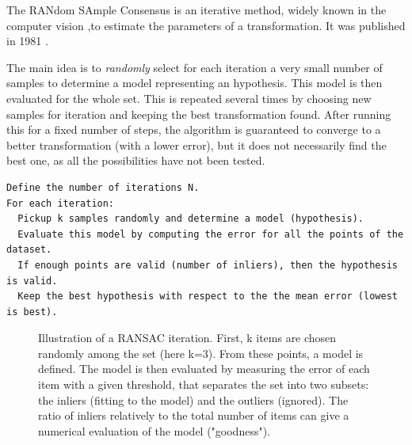 The RANdom SAmple Consensus is an iterative method, widely known in the computer vision ,to estimate the parameters of a transformation. It was published in 1981 \cite{FischlerB81}.

The main idea is to \emph{randomly} select for each iteration a very small number of samples to determine a model representing an hypothesis. This model is then evaluated for the whole set. This is repeated several times by choosing new samples for iteration and keeping the best transformation found. After running this for a fixed number of steps, the algorithm is guaranteed to converge to a better transformation (with a lower error), but it does not necessarily find the best one, as all the possibilities have not been tested. 

\begin{verbatim}
Define the number of iterations N.
For each iteration:
  Pickup k samples randomly and determine a model (hypothesis).
  Evaluate this model by computing the error for all the points of the dataset.
  If enough points are valid (number of inliers), then the hypothesis is valid.
  Keep the best hypothesis with respect to the the mean error (lowest is best).
\end{verbatim}

\begin{figure}[h!]
\centering%
\caption{Illustration of a RANSAC iteration. First, k items are chosen randomly among the set (here k=3). From these points, a model is defined. The model is then evaluated by measuring the error of each item with a given threshold, that separates the set into two subsets: the inliers (fitting to the model) and the outliers (ignored). The ratio of inliers relatively to the total number of items can give a numerical evaluation of the model ("goodness").}
\end{figure}


